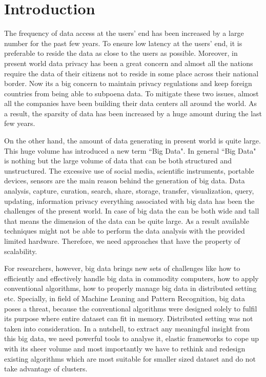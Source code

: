 \chapter{Introduction}\label{intro}
The frequency of data access at the users' end has been increased by a large number for the past few years. To ensure low latency at the users' end, it is preferable to reside the data as close to the users as possible. Moreover, in present world data privacy has been a great concern and almost all the nations require the data of their citizens not to reside in some place across their national border. Now its a big concern to maintain privacy regulations and keep foreign countries from being able to subpoena data. To mitigate these two issues, almost all the companies have been building their data centers all around the world. As a result, the sparsity of data has been increased by a huge amount during the last few years.

On the other hand, the amount of data generating in present world is quite large. This huge volume has introduced  a new term ``Big Data". In general ``Big Data" is nothing but the large volume of data that can be both structured and unstructured. The excessive use of social media, scientific instruments, portable devices, sensors are the main reason behind the generation of big data. Data analysis, capture, curation, search, share, storage, transfer, visualization, query, updating, information privacy everything associated with big data has been the challenges of the present world. In case of big data the can be both wide and tall that means the dimension of the data can be quite large. As a result available techniques might not be able to perform the data analysis with the provided limited hardware. Therefore, we need  approaches that have the property of scalability.

For researchers, however, big data brings new sets of challenges like how to efficiently and effectively handle big data in commodity computers, how to apply conventional
algorithms, how
to properly manage big data in distributed setting etc. Specially, in field of
Machine Leaning and
Pattern Recognition, big data poses a threat, because the conventional algorithms
were designed
solely to fulfil its purpose where entire dataset can fit in memory. Distributed
setting was not
taken into consideration. In a nutshell, to extract any meaningful insight from this
big data, we
need powerful tools to analyse it, elastic frameworks to cope up with its sheer
volume and most
importantly we have to rethink and redesign existing algorithms which are most
suitable for
smaller sized dataset and do not take advantage of clusters.


